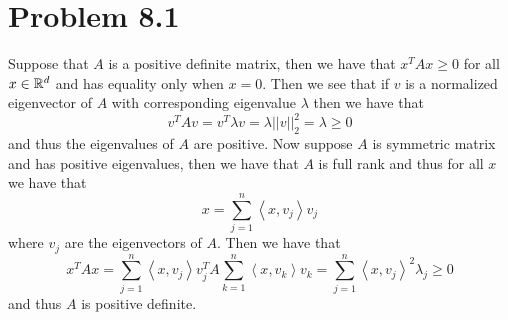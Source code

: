 \documentclass[12pt]{report}
\newcommand{\norm}[1]{\left|\left|#1\right|\right|}
\newcommand{\inner}[2]{\left\langle#1,#2\right\rangle}
\begin{document}
\maketitle

\section*{Problem 8.1}
Suppose that $A$ is a positive definite matrix, then we have that $x^TAx \geq  0$ for all $x \in \mathbb{R}^d$ and has equality only when $x = 0$. Then we see that if $v$ is a normalized eigenvector of $A$ with corresponding eigenvalue $\lambda$ then we have that
\begin{equation*}
  v^TAv = v^T \lambda v = \lambda \norm{v}_2^2 = \lambda \geq 0
\end{equation*}
and thus the eigenvalues of $A$ are positive. Now suppose $A$ is symmetric matrix and has positive eigenvalues, then we have that $A$ is full rank and thus for all $x$ we have that
\begin{equation*}
 x = \sum_{j=1}^n \inner{x}{v_j}v_j 
\end{equation*}
where $v_j$ are the eigenvectors of $A$. Then we have that
\begin{equation*}
  x^TAx = \sum_{j=1}^n \inner{x}{v_j}v_j^TA\sum_{k=1}^n \inner{x}{v_k}v_k = \sum_{j=1}^n \inner{x}{v_j}^2\lambda_j \geq 0
\end{equation*}
and thus $A$ is positive definite.
\end{document}

